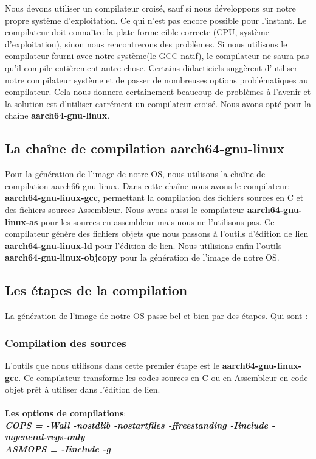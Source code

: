 \documentclass[12pt,a4paper,oneside]{book}
\begin{document}
	Nous devons utiliser un compilateur croisé, sauf si nous développons sur notre propre système d’exploitation. Ce qui n'est pas encore possible pour l'instant. Le compilateur doit connaître la plate-forme cible correcte (CPU, système d’exploitation), sinon nous rencontrerons des problèmes. Si nous utilisons le compilateur fourni avec notre système(le GCC natif), le compilateur ne saura pas qu’il compile entièrement autre chose. Certains didacticiels suggèrent d’utiliser notre compilateur système et de passer de nombreuses options problématiques au compilateur. Cela nous donnera certainement beaucoup de problèmes à l’avenir et la solution est d'utiliser carrément un compilateur croisé. Nous avons opté pour la chaîne \textbf{aarch64-gnu-linux}.
	
	\subsection{La chaîne de compilation aarch64-gnu-linux}
	Pour la génération de l'image de notre OS, nous utilisons la chaîne de compilation aarch66-gnu-linux. Dans cette chaîne nous avons le compilateur: \textbf{aarch64-gnu-linux-gcc}, permettant la compilation des fichiers sources en C et des fichiers sources Assembleur. Nous avons aussi le compilateur \textbf{aarch64-gnu-linux-as} pour les sources en assembleur mais nous ne l'utilisons pas. Ce compilateur génère des fichiers objets que nous passons à l'outils d'édition de lien \textbf{aarch64-gnu-linux-ld} pour l'édition de lien. Nous utilisions enfin l'outils \textbf{aarch64-gnu-linux-objcopy} pour la génération de l'image de notre OS.
	
	\subsection{Les étapes de la compilation}
	La génération de l'image de notre OS passe bel et bien par des étapes. Qui sont :
	\subsubsection{Compilation des sources}
	L'outils que nous utilisons dans cette premier étape est le \textbf{aarch64-gnu-linux-gcc}. Ce compilateur transforme les codes sources en C ou en Assembleur en code objet prêt à utiliser dans l'édition de lien.\\\\
	
	\textbf{Les options de compilations}:\\
	\textit{\textbf{COPS = -Wall -nostdlib -nostartfiles -ffreestanding -Iinclude -mgeneral-regs-only}}\\
	\textit{\textbf{ASMOPS = -Iinclude  -g}}\\
	
\end{document}

